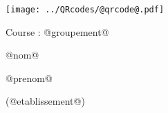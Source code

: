 \Huge

\begin{block} %



\vspace{0.5cm}


\begin{minipage}{0.38\linewidth}
\texttt{[image: ../QRcodes/@qrcode@.pdf]}

\vspace{0.5cm}

	Course : @groupement@
\end{minipage}
\begin{minipage}{0.6\linewidth}
{}\hfill {}
{}\hfill {}

\bigskip

\begin{center}
@nom@

@prenom@

(@etablissement@)
\end{center}
\end{minipage}


\end{block}

\vfill
